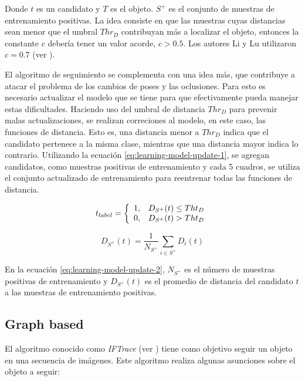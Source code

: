 \documentclass[a4paper,10pt]{article}
\begin{document}
Donde $t$ es un candidato y $T$ es el objeto. $S^{+}$ es el
conjunto de muestras de entrenamiento positivas. La idea consiste en
que las muestras cuyas distancias sean menor que el umbral $Thr_{D}$
contribuyan más a localizar el objeto, entonces la constante $c$ debería tener
un valor acorde, $c > 0.5$. Los autores Li y Lu utilizaron $c = 0.7$ (ver
\cite{local-learning}).

El algoritmo de seguimiento se complementa con una idea más, que
contribuye a atacar el problema de los cambios de poses y las oclusiones.
Para esto es necesario actualizar el modelo que se tiene para
que efectivamente pueda manejar estas dificultades.
Haciendo uso del umbral de distancia $Thr_{D}$ para prevenir
malas actualizaciones, se realizan correciones al modelo,
en este caso, las funciones de distancia. Esto es, una distancia
menor a $Thr_{D}$ indica que el candidato pertenece a la misma clase,
mientras que una distancia mayor indica lo contrario. Utilizando
la ecuación \ref{eq:learning-model-update-1}, se agregan candidatos,
como muestras positivas de entrenamiento y cada 5 cuadros,
se utiliza el conjunto actualizado de entrenamiento para
reentrenar todas las funciones de distancia.

\begin{equation}
    \label{eq:learning-model-update-1}
    t_{label} = \left\{
                \begin{array}{l l}
                    1, & D_{S^{+}}(t) \leq Tht_{D}\\
                    0, & D_{S^{+}}(t) >  Tht_{D}
                \end{array} \right.
\end{equation}

\begin{equation}
    \label{eq:learning-model-update-2}
    D_{S^{+}}(t) = \dfrac{1}{N_{S^{+}}} \sum_{i \in S^{+}} D_{i}(t)
\end{equation}

En la ecuación \ref{eq:learning-model-update-2}, $N_{S^{+}}$ es el
número de muestras positivas de entrenamiento y $D_{S^{+}}(t)$
es el promedio de distancia del candidato $t$ a las muestras
de entrenamiento positivas.

\subsection{Graph based}

El algoritmo conocido como \textit{IFTrace} (ver \cite{IFTrace}) tiene como objetivo
seguir un objeto en una secuencia de imágenes. Este algoritmo realiza algunas
asunciones sobre el objeto a seguir:
\end{document}
